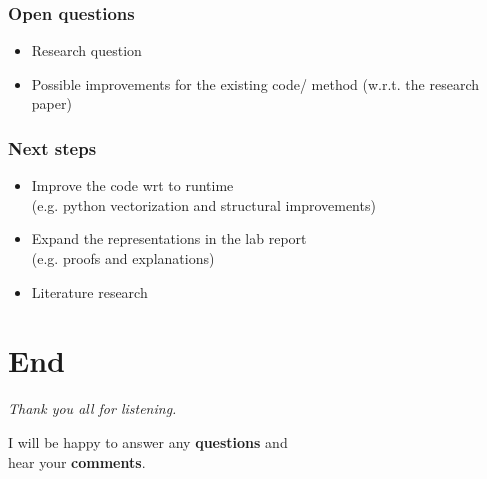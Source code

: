 \begin{frame}
\frametitle{Open questions}
	\begin{itemize}
		\item Research question\newline
		
		\item Possible improvements for the existing code/ method (w.r.t. the research paper)
	\end{itemize}	
\end{frame}

\begin{frame}
\frametitle{Next steps}
	\begin{itemize}
		\item Improve the code wrt to runtime\\
		(e.g. python vectorization and structural improvements)\newline
		\item Expand the representations in the lab report\\
		(e.g. proofs and explanations)\newline
		\item Literature research
	\end{itemize}	
\end{frame}

\section{End}
\begin{frame}[c]
	\centering %
	\begin{huge}
		\emph{Thank you all for listening.}\\
	\end{huge}
	\vspace{2 cm}
	I will be happy to answer any \textbf{questions} and\\
	hear your \textbf{comments}.
\end{frame}

